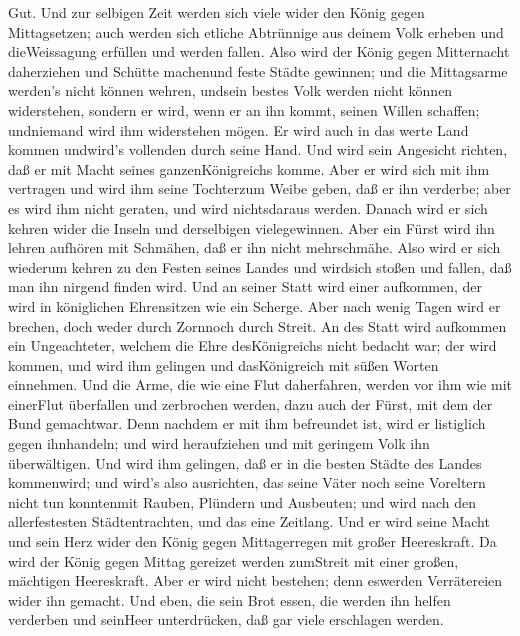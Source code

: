 Gut.  Und zur selbigen Zeit werden sich viele wider den
König gegen Mittagsetzen; auch werden sich etliche Abtrünnige aus deinem
Volk erheben und dieWeissagung erfüllen und werden fallen. 
Also wird der König gegen Mitternacht daherziehen und Schütte machenund
feste Städte gewinnen; und die Mittagsarme werden's nicht können wehren,
undsein bestes Volk werden nicht können widerstehen, 
sondern er wird, wenn er an ihn kommt, seinen Willen schaffen;
undniemand wird ihm widerstehen mögen. Er wird auch in das werte Land
kommen undwird's vollenden durch seine Hand.  Und wird sein
Angesicht richten, daß er mit Macht seines ganzenKönigreichs komme. Aber
er wird sich mit ihm vertragen und wird ihm seine Tochterzum Weibe
geben, daß er ihn verderbe; aber es wird ihm nicht geraten, und wird
nichtsdaraus werden.  Danach wird er sich kehren wider die
Inseln und derselbigen vielegewinnen. Aber ein Fürst wird ihn lehren
aufhören mit Schmähen, daß er ihn nicht mehrschmähe.  Also
wird er sich wiederum kehren zu den Festen seines Landes und wirdsich
stoßen und fallen, daß man ihn nirgend finden wird.  Und an
seiner Statt wird einer aufkommen, der wird in königlichen Ehrensitzen
wie ein Scherge. Aber nach wenig Tagen wird er brechen, doch weder durch
Zornnoch durch Streit.  An des Statt wird aufkommen ein
Ungeachteter, welchem die Ehre desKönigreichs nicht bedacht war; der
wird kommen, und wird ihm gelingen und dasKönigreich mit süßen Worten
einnehmen.  Und die Arme, die wie eine Flut daherfahren,
werden vor ihm wie mit einerFlut überfallen und zerbrochen werden, dazu
auch der Fürst, mit dem der Bund gemachtwar.  Denn nachdem
er mit ihm befreundet ist, wird er listiglich gegen ihnhandeln; und wird
heraufziehen und mit geringem Volk ihn überwältigen.  Und
wird ihm gelingen, daß er in die besten Städte des Landes kommenwird;
und wird's also ausrichten, das seine Väter noch seine Voreltern nicht
tun konntenmit Rauben, Plündern und Ausbeuten; und wird nach den
allerfestesten Städtentrachten, und das eine Zeitlang.  Und
er wird seine Macht und sein Herz wider den König gegen Mittagerregen
mit großer Heereskraft. Da wird der König gegen Mittag gereizet werden
zumStreit mit einer großen, mächtigen Heereskraft. Aber er wird nicht
bestehen; denn eswerden Verrätereien wider ihn gemacht. 
Und eben, die sein Brot essen, die werden ihn helfen verderben und
seinHeer unterdrücken, daß gar viele erschlagen werden. 
